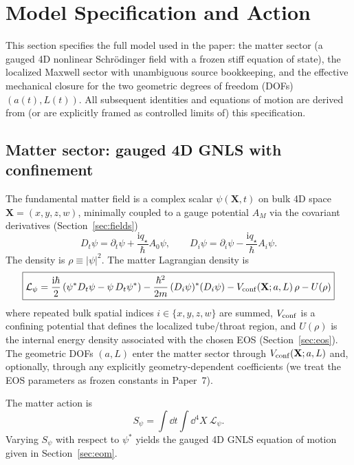 \documentclass[11pt]{article}
\newcommand{\ii}{\mathrm{i}}
\newcommand{\qstar}{q_\star}
\begin{document}
\section{Model Specification and Action}
\label{sec:action}

This section specifies the full model used in the paper: the matter sector (a gauged 4D nonlinear Schr\"odinger field with a frozen stiff equation of state), the localized Maxwell sector with unambiguous source bookkeeping, and the effective mechanical closure for the two geometric degrees of freedom (DOFs) $(a(t),L(t))$. All subsequent identities and equations of motion are derived from (or are explicitly framed as controlled limits of) this specification.

\subsection{Matter sector: gauged 4D GNLS with confinement}
\label{sec:action-matter}

The fundamental matter field is a complex scalar $\psi(\mathbf{X},t)$ on bulk 4D space $\mathbf{X}=(x,y,z,w)$, minimally coupled to a gauge potential $A_M$ via the covariant derivatives (Section~\ref{sec:fields})
\begin{equation}
D_t \psi = \partial_t \psi + \frac{\ii \qstar}{\hbar}A_0\psi,
\qquad
D_i \psi = \partial_i \psi - \frac{\ii \qstar}{\hbar}A_i\psi.
\end{equation}
The density is $\rho \equiv |\psi|^2$. The matter Lagrangian density is
\begin{equation}
\boxed{
\mathcal L_\psi
=
\frac{\ii\hbar}{2}\left(\psi^*D_t\psi-\psi\,D_t\psi^*\right)
-\frac{\hbar^2}{2m}\,(D_i\psi)^*(D_i\psi)
- V_{\rm conf}(\mathbf{X};a,L)\,\rho
- U(\rho)
}
\label{eq:Lpsi}
\end{equation}
where repeated bulk spatial indices $i\in\{x,y,z,w\}$ are summed, $V_{\rm conf}$ is a confining potential that defines the localized tube/throat region, and $U(\rho)$ is the internal energy density associated with the chosen EOS (Section~\ref{sec:eos}). The geometric DOFs $(a,L)$ enter the matter sector through $V_{\rm conf}(\mathbf{X};a,L)$ and, optionally, through any explicitly geometry-dependent coefficients (we treat the EOS parameters as frozen constants in Paper~7).

The matter action is
\begin{equation}
S_\psi = \int \dd t \int \dd^4X\ \mathcal L_\psi.
\end{equation}
Varying $S_\psi$ with respect to $\psi^*$ yields the gauged 4D GNLS equation of motion given in Section~\ref{sec:eom}.
\end{document}
